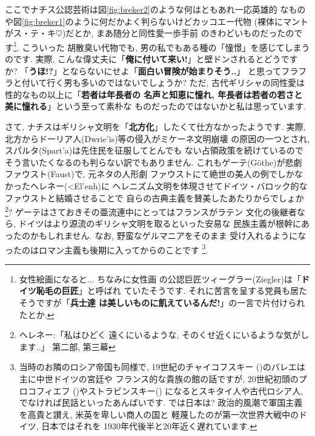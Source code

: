 ここでナチス公認芸術は図\ref{fig:breker2}のような何はともあれ一応英雄的
なものや図\ref{fig:breker1}のように何だかよく判らないけどカッコエー代物
(裸体にマントがス・テ・キ$\heartsuit$)だとか, まあ随分と同性愛一歩手前
のきわどいものだったのです\footnote{女性絵画になると... ちなみに女性画
の公認巨匠ツィーグラー(Ziegler)は「\textbf{ドイツ恥毛の巨匠}」と呼ばれ
ていたそうです. それに苦言を呈する党員も居たそうですが「\textbf{兵士達
は美しいものに飢えているんだ!}」の一言で片付けられたとか.}. こういった
胡散臭い代物でも, 男の私でもある種の「憧憬」を感じてしまうのです. 実際,
 こんな偉丈夫に「\textbf{俺に付いて来い!}」と壁ドンされるとどうですか?
 「\textbf{うほ!?}」とならないにせよ「\textbf{面白い冒険が始まりそう..}」
と思ってフラフラと付いて行く男も多いのではないでしょうか?
 ただ, 古代ギリシャの同性愛は性的なもの以上に「\textbf{若者は年長者の
名声と知恵に憧れ, 年長者は若者の若さと美に憧れる}」という至って素朴な
ものだったのではないかと私は思っています.
\newline

さて, ナチスはギリシャ文明を「\textbf{北方化}」したくて仕方なかったようです.
 実際, 北方からドーリア人(\textgreek{Dwrie'is})等の侵入がミケーネ文明崩壊
の原因の一つとされ, スパルタ(\textgreek{Spart'a})は先住民を征服してとんでも
ない占領政策を続けているのでそう言いたくなるのも判らない訳でもありません.
 これもゲーテ(G\"othe)が悲劇ファウスト(Faust)\cite{ゲーテ}で, 元ネタの人形劇
ファウストにて絶世の美人の例でしかなかったヘレネー(\textgreek{<El'enh})に
ヘレニズム文明を体現させてドイツ・バロック的なファウストと結婚させることで
自らの古典主義を賛美したあたりからでしょか\footnote{ヘレネー:「私はひどく
遠くにいるような, そのくせ近くにいるような気がします..」\cite{ゲーテ}
第二部, 第三幕}?  ゲーテはさておきその亜流連中にとってはフランスがラテン
文化の後継者なら, ドイツはより源流のギリシャ文明を取るといった安易な
民族主義が根幹にあったのかもしれません. なお, 野蛮なゲルマニアをそのまま
受け入れるようになったのはロマン主義も後期に入ってからのことです
\footnote{当時のお隣のロシア帝国も同様で, 19世紀のチャイコフスキー
({})のバレエは主に中世ドイツの宮廷や
フランス的な貴族の館の話ですが, 20世紀初頭のプロコフィエフ
({})やストラビンスキー({})
になるとスキタイ人や古代ロシア人, でなければ民話といったあんばいです.
 では日本は? 政治的風潮で軍国主義を高貴と讃え, 米英を卑しい商人の国と
軽蔑したのが第一次世界大戦中のドイツ\cite{クラウス}, 日本ではそれを
1930年代後半と20年近く遅れています.}.
\newline

